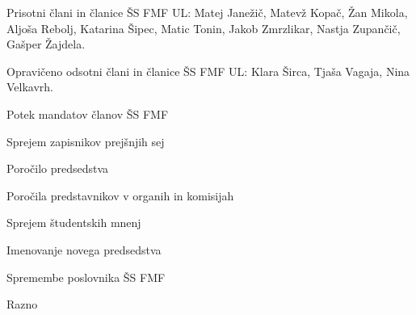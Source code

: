 \documentclass{seja}
\begin{document}
Prisotni člani in članice ŠS FMF UL:
Matej Janežič,
Matevž Kopač,
Žan Mikola,
Aljoša Rebolj,
Katarina Šipec,
Matic Tonin,
Jakob Zmrzlikar,
Nastja Zupančič,
Gašper Žajdela.

Opravičeno odsotni člani in članice ŠS FMF UL:
Klara Širca,
Tjaša Vagaja,
Nina Velkavrh.

\begin{red}
    \item
    Potek mandatov članov ŠS FMF
	\item
	Sprejem zapisnikov prejšnjih sej 
	\item
	Poročilo predsedstva
	\item
	Poročila predstavnikov v organih in komisijah 
    \item
    Sprejem študentskih mnenj
    \item
    Imenovanje novega predsedstva 
    \item
    Spremembe poslovnika ŠS FMF
    \item
    Razno
\end{red}
\end{document}
